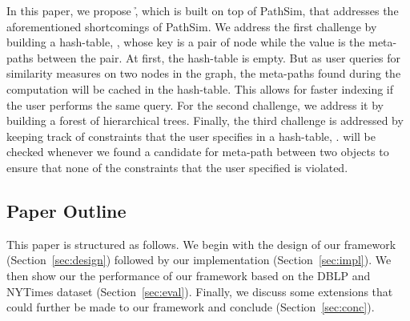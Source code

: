 In this paper, we propose \h, which is built on top of PathSim, that addresses
the aforementioned shortcomings of PathSim. We address the first challenge by
building a hash-table, \mTable, whose key is a pair of node while the value is
the meta-paths between the pair. At first, the hash-table is empty. But as user
queries for similarity measures on two nodes in the graph, the meta-paths found
during the computation will be cached in the hash-table. This allows for faster
indexing if the user performs the same query. For the second challenge, we
address it by building a forest of hierarchical trees. Finally, the third
challenge is addressed by keeping track of constraints that the user specifies
in a hash-table, \cTable. \cTable will be checked whenever we found a candidate
for meta-path between two objects to ensure that none of the constraints that
the user specified is violated.

\subsection{Paper Outline}

This paper is structured as follows. We begin with the design of our framework
(Section~\ref{sec:design}) followed by our implementation
(Section~\ref{sec:impl}). We then show our the performance of our framework
based on the DBLP and NYTimes dataset (Section~\ref{sec:eval}).
Finally, we discuss some extensions that could further be made to our framework
and conclude (Section~\ref{sec:conc}).

